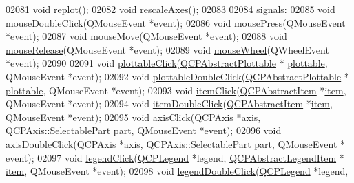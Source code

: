 \begin{DoxyCode}
02081   \textcolor{keywordtype}{void} \hyperlink{a00116_a563540b54b2a09c8ef092d42e9621f42}{replot}();
02082   \textcolor{keywordtype}{void} \hyperlink{a00116_a098c37f4447cbea48764873689ba1695}{rescaleAxes}();
02083   
02084 signals:
02085   \textcolor{keywordtype}{void} \hyperlink{a00116_a9b232142c64fcf273a953ee08e5b90e9}{mouseDoubleClick}(QMouseEvent *event);
02086   \textcolor{keywordtype}{void} \hyperlink{a00116_aca75bf9afb5dd19349c375de2a87a051}{mousePress}(QMouseEvent *event);
02087   \textcolor{keywordtype}{void} \hyperlink{a00116_a742ca4f94688bed2a685fd8a56ce5704}{mouseMove}(QMouseEvent *event);
02088   \textcolor{keywordtype}{void} \hyperlink{a00116_ac8dc0ee6bb98e923c00b4ebafbe6134d}{mouseRelease}(QMouseEvent *event);
02089   \textcolor{keywordtype}{void} \hyperlink{a00116_ac80a14206f99304a91d2aa55775ec3ff}{mouseWheel}(QWheelEvent *event);
02090   
02091   \textcolor{keywordtype}{void} \hyperlink{a00116_a57e5efa8a854620e9bf62d31fc139f53}{plottableClick}(\hyperlink{a00024}{QCPAbstractPlottable} *
      \hyperlink{a00116_a5c198d46ea2a2255a1b73e2c590f0364}{plottable}, QMouseEvent *event);
02092   \textcolor{keywordtype}{void} \hyperlink{a00116_af2e6f1cea923dae437681d01ce7d0c31}{plottableDoubleClick}(\hyperlink{a00024}{QCPAbstractPlottable} *
      \hyperlink{a00116_a5c198d46ea2a2255a1b73e2c590f0364}{plottable}, QMouseEvent *event);
02093   \textcolor{keywordtype}{void} \hyperlink{a00116_ae16b51f52d2b7aebbc7e3e74e6ff2e4b}{itemClick}(\hyperlink{a00022}{QCPAbstractItem} *\hyperlink{a00116_aac743a709d025448e36cb65c9117d64b}{item}, QMouseEvent *event);
02094   \textcolor{keywordtype}{void} \hyperlink{a00116_ac83aa9f5a3e9bb3efc9cdc763dcd42a6}{itemDoubleClick}(\hyperlink{a00022}{QCPAbstractItem} *\hyperlink{a00116_aac743a709d025448e36cb65c9117d64b}{item}, QMouseEvent *event);
02095   \textcolor{keywordtype}{void} \hyperlink{a00116_abf635f8b56ab5c16d5de9f358543e82b}{axisClick}(\hyperlink{a00025}{QCPAxis} *axis, QCPAxis::SelectablePart part, QMouseEvent *event);
02096   \textcolor{keywordtype}{void} \hyperlink{a00116_a6df35357460181a72da3e93d600f5256}{axisDoubleClick}(\hyperlink{a00025}{QCPAxis} *axis, QCPAxis::SelectablePart part, QMouseEvent *
      event);
02097   \textcolor{keywordtype}{void} \hyperlink{a00116_a79cff0baafbca10a3aaf694d2d3b9ab3}{legendClick}(\hyperlink{a00045}{QCPLegend} *legend, \hyperlink{a00023}{QCPAbstractLegendItem} *
      \hyperlink{a00116_aac743a709d025448e36cb65c9117d64b}{item}, QMouseEvent *event);
02098   \textcolor{keywordtype}{void} \hyperlink{a00116_a0250f835c044521df1619b132288bca7}{legendDoubleClick}(\hyperlink{a00045}{QCPLegend} *legend,  

\end{DoxyCode}
